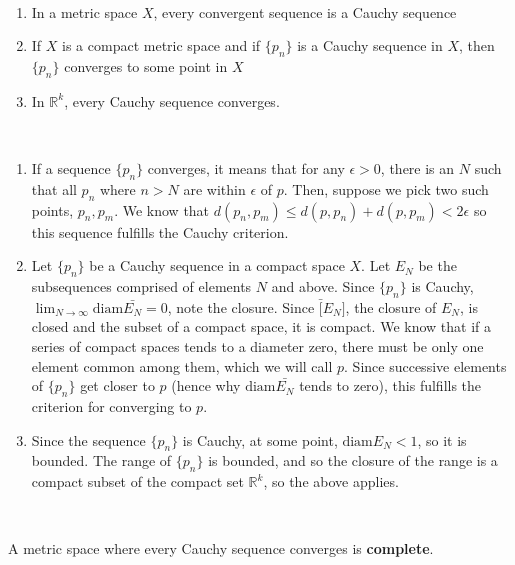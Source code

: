\documentclass{article}
\begin{document}
\begin{theorem}
\

\begin{enumerate}
    \item In a metric space $X$, every convergent sequence is a Cauchy sequence
    \item If $X$ is a compact metric space and if $\{p_n\}$ is a Cauchy sequence in $X$, then $\{p_n\}$ converges to some point in $X$
    \item In $\mathbb{R}^k$, every Cauchy sequence converges.
\end{enumerate}
\end{theorem}

\begin{customproof}
\
\begin{enumerate}
\item If a sequence $\{p_n\}$ converges, it means that for any $\epsilon >0$, there is an $N$ such that all $p_n$ where $n>N$ are within $\epsilon$ of $p$. Then, suppose we pick two such points, $p_n, p_m$. We know that $d(p_n, p_m) \leq d(p, p_n) + d(p, p_m) < 2\epsilon$ so this sequence fulfills the Cauchy criterion.
\item Let $\{p_n\}$ be a Cauchy sequence in a compact space $X$. Let $E_N$ be the subsequences comprised of elements $N$ and above. Since $\{p_n\}$ is Cauchy, $\lim_{N \to \infty} \text{diam} \bar{E_N} = 0$, note the closure. Since $\bar[E_N]$, the closure of $E_N$, is closed and the subset of a compact space, it is compact. We know that if a series of compact spaces tends to a diameter zero, there must be only one element common among them, which we will call $p$. Since successive elements of $\{p_n\}$ get closer to $p$ (hence why $\text{diam} \bar{E_N}$ tends to zero), this fulfills the criterion for converging to $p$.

\item Since the sequence $\{p_n\}$ is Cauchy, at some point, $\text{diam} E_N < 1$, so it is bounded. The range of $\{p_n\}$ is bounded, and so the closure of the range is a compact subset of the compact set $\mathbb{R}^k$, so the above applies.
\end{enumerate}
\end{customproof}

\begin{definition}
\

A metric space where every Cauchy sequence converges is \textbf{complete}. 
\end{definition}
\end{document}
